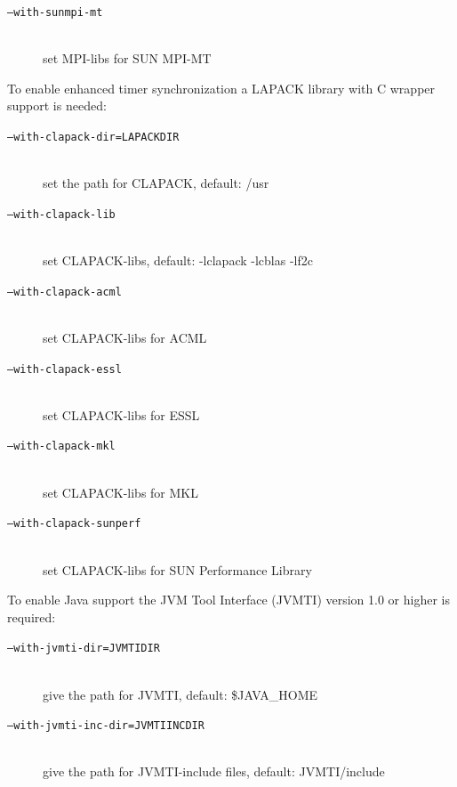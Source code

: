 \documentclass[a4paper,twoside,12pt,BCOR12mm]{scrbook}
\begin{document}
\begin{latexonly}
\begin{description}
\item[\texttt{--with-sunmpi-mt}] ~\\
                              set MPI-libs for SUN MPI-MT
\end{description}

\noindent To enable enhanced timer synchronization a LAPACK library with C wrapper support is needed:

\begin{description}
\item[\texttt{--with-clapack-dir=LAPACKDIR}] ~\\
                              set the path for CLAPACK, default: /usr

\item[\texttt{--with-clapack-lib}] ~\\
                              set CLAPACK-libs, default: -lclapack -lcblas -lf2c

\item[\texttt{--with-clapack-acml}] ~\\
                              set CLAPACK-libs for ACML

\item[\texttt{--with-clapack-essl}] ~\\
                              set CLAPACK-libs for ESSL

\item[\texttt{--with-clapack-mkl}] ~\\
                              set CLAPACK-libs for MKL

\item[\texttt{--with-clapack-sunperf}] ~\\
                              set CLAPACK-libs for SUN Performance Library

\end{description}

\noindent To enable Java support the JVM Tool Interface (JVMTI) version 1.0 or higher is required:

\begin{description}
\item[\texttt{--with-jvmti-dir=JVMTIDIR}] ~\\
                              give the path for JVMTI, default: \$JAVA\_HOME

\item[\texttt{--with-jvmti-inc-dir=JVMTIINCDIR}] ~\\
                              give the path for JVMTI-include files, default:
                              JVMTI/include


\end{description}
\end{latexonly}
\end{document}
